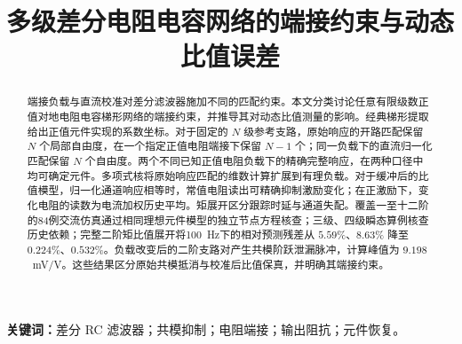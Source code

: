 \documentclass[11pt,a4paper,fontset=none,scheme=plain]{ctexart}
\title{多级差分电阻电容网络的端接约束与动态比值误差}
\author{}
\date{}
\begin{document}
\maketitle
\begin{abstract}
端接负载与直流校准对差分滤波器施加不同的匹配约束。本文分类讨论任意有限级数正值对地电阻电容梯形网络的端接约束，并推导其对动态比值测量的影响。经典梯形提取给出正值元件实现的系数坐标。对于固定的 $N$ 级参考支路，原始响应的开路匹配保留 $N$ 个局部自由度，在一个指定正值电阻端接下保留 $N-1$ 个；同一负载下的直流归一化匹配保留 $N$ 个自由度。两个不同已知正值电阻负载下的精确完整响应，在两种口径中均可确定元件。多项式核将原始响应匹配的维数计算扩展到有理负载。对于缓冲后的比值模型，归一化通道响应相等时，常值电阻读出可精确抑制激励变化；在正激励下，变化电阻的读数为电流加权历史平均。矩展开区分跟踪时延与通道失配。覆盖一至十二阶的84例交流仿真通过相同理想元件模型的独立节点方程核查；三级、四级瞬态算例核查历史依赖；完整二阶矩比值展开将100~Hz下的相对预测残差从 $5.59\%$、$8.63\%$ 降至 $0.224\%$、$0.532\%$。负载改变后的二阶支路对产生共模阶跃泄漏脉冲，计算峰值为 $9.198$~mV/V。这些结果区分原始共模抵消与校准后比值保真，并明确其端接约束。
\end{abstract}
\noindent\textbf{关键词：}差分 RC 滤波器；共模抑制；电阻端接；输出阻抗；元件恢复。













\FloatBarrier


\end{document}
